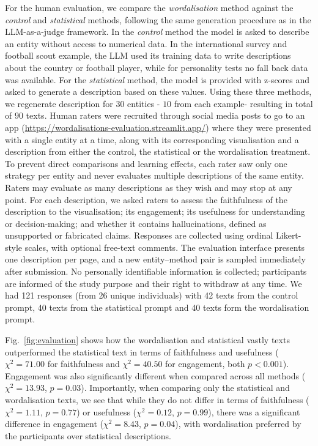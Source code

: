 \documentclass{article}
\begin{document}
For the human evaluation, we compare the {\it wordalisation} method against the \textit{control} and \textit{statistical} methods, following the same generation procedure as in the LLM-as-a-judge framework. In the {\it control} method the model is asked to describe an entity without access to numerical data. In the international survey and football scout example, the LLM used its training data to write descriptions about the country or football player, while for personality tests no fall back data was available. For the {\it statistical} method, the model is provided with z-scores and asked to generate a description based on these values. Using these three methods, we regenerate description for $30$ entities - $10$ from each example- resulting in  total of $90$ texts. Human raters were recruited through social media posts to go to an app (\url{https://wordalisations-evaluation.streamlit.app/}) where they were presented with a single entity at a time, along with its corresponding visualisation and a description from either the control, the statistical or the wordalisation treatment. To prevent direct comparisons and learning effects, each rater saw only one strategy per entity and never evaluates multiple descriptions of the same entity. Raters may evaluate as many descriptions as they wish and may stop at any point. For each description, we asked raters to assess the faithfulness of the description to the visualisation; its engagement; its usefulness for understanding or decision-making; and whether it contains hallucinations, defined as unsupported or fabricated claims. Responses are collected using ordinal Likert-style scales, with optional free-text comments. The evaluation interface presents one description per page, and a new entity–method pair is sampled immediately after submission. No personally identifiable information is collected; participants are informed of the study purpose and their right to withdraw at any time. We had 121 responses (from 26 unique individuals) with 42 texts from the control prompt, 40 texts from the statistical prompt and 40 texts form the wordalisation prompt. 

Fig.~\ref{fig:evaluation} shows how the wordalisation and statistical vastly texts outperformed the statistical text in terms of faithfulness and usefulness ($\chi^2=71.00$ for faithfulness and $\chi^2=40.50$ for engagement, both $p < 0.001$). Engagement was also significantly different when compared across all methods ($\chi^2=13.93$, $p = 0.03$). Importantly, when comparing only the statistical and wordalisation texts, we see that while they do not differ in terms of faithfulness ($\chi^2=1.11$, $p=0.77$) or usefulness ($\chi^2=0.12$, $p = 0.99$), there was a significant difference in engagement ($\chi^2= 8.43$, $p = 0.04$), with wordalisation preferred by the participants over statistical descriptions. 
\end{document}
